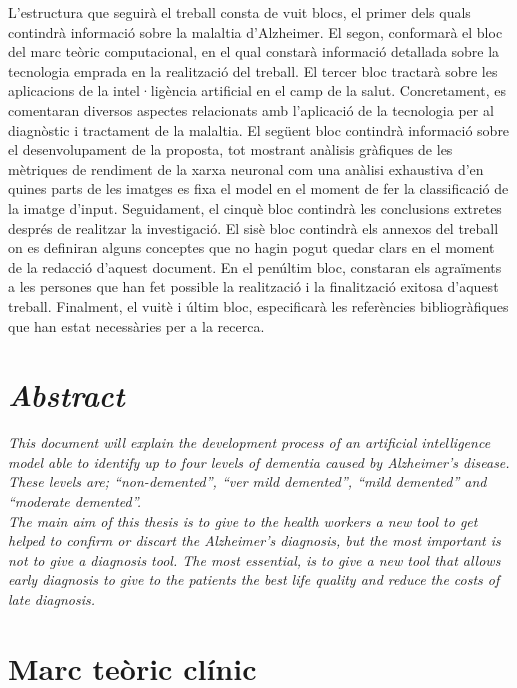 \documentclass[a4paper,12pt]{article}
\begin{document}
L'estructura que seguirà el treball consta de vuit blocs, el primer dels quals contindrà informació sobre la malaltia d'Alzheimer. El segon, conformarà el bloc del marc teòric computacional, en el qual constarà informació detallada sobre la tecnologia emprada en la realització del treball. El tercer bloc tractarà sobre les aplicacions de la intel·ligència artificial en el camp de la salut. Concretament, es comentaran diversos aspectes relacionats amb l'aplicació de la tecnologia per al diagnòstic i tractament de la malaltia. El següent bloc contindrà informació sobre el desenvolupament de la proposta, tot mostrant anàlisis gràfiques de les mètriques de rendiment de la xarxa neuronal com una anàlisi exhaustiva d'en quines parts de les imatges es fixa el model en el moment de fer la classificació de la imatge d'input. Seguidament, el cinquè bloc contindrà les conclusions extretes després de realitzar la investigació. El sisè bloc contindrà els annexos del treball on es definiran alguns conceptes que no hagin pogut quedar clars en el moment de la redacció d'aquest document. En el penúltim bloc, constaran els agraïments a les persones que han fet possible la realització i la finalització exitosa d'aquest treball. Finalment, el vuitè i últim bloc, especificarà les referències bibliogràfiques que han estat necessàries per a la recerca.
\section*{\textit{Abstract}}
\textit{This document will explain the development process of an artificial intelligence model able to identify up to four levels of dementia caused by Alzheimer's disease. These levels are; “non-demented”, “ver mild demented”, “mild demented” and “moderate demented”.\\
The main aim of this thesis is to give to the health workers a new tool to get helped to confirm or discart the Alzheimer's diagnosis, but the most important is not to give a diagnosis tool. The most essential, is to give a new tool that allows early diagnosis to give to the patients the best life quality and reduce the costs of late diagnosis.}
\section*{Marc teòric clínic}
\end{document}
